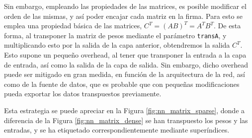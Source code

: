 Sin embargo, empleando las propiedades de las matrices, es posible modificar el orden de las mismas, y así poder encajar cada matriz en la firma. Para esto se emplea una propiedad básica de las matrices, $C^{T} = (AB)^{T} = A^{T}B^{T}$. De esta forma, al transponer la matriz de pesos mediante el parámetro \texttt{transA}, y multiplicando esto por la salida de la capa anterior, obtendremos la salida $C^{T}$. Esto supone un pequeño overhead, al tener que transponer la entrada a la capa de entrada, así como la salida de la capa de salida. Sin embargo, dicho overhead puede ser mitigado en gran medida, en función de la arquitectura de la red, así como de la fuente de datos, que es probable que con pequeñas modificaciones pueda exportar los datos transpuestos previamente.

Esta estrategia se puede apreciar en la Figura \ref{fig:nn_matrix_sparse}, donde a diferencia de la Figura \ref{fig:nn_matrix_dense} se han transpuesto los pesos y las entradas, y se ha etiquetado correspondientemente mediante superíndices.

